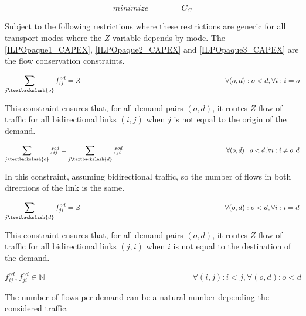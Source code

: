 \begin{equation}
minimize \qquad \qquad C_C
\label{ILPOpaque_CAPEX}
\end{equation}

\vspace{11pt}
Subject to the following restrictions where these restrictions are generic for all transport modes where the $Z$ variable depends by mode. The \ref{ILPOpaque1_CAPEX}, \ref{ILPOpaque2_CAPEX} and \ref{ILPOpaque3_CAPEX} are the flow conservation constraints.

\begin{equation}
\sum_{j\textbackslash \{o\}} f_{ij}^{od} = Z  \qquad \qquad \qquad \qquad \qquad \qquad \qquad \qquad \qquad \qquad
\forall(o,d) : o < d, \forall i: i = o
\label{ILPOpaque1_CAPEX}
\end{equation}

This constraint ensures that, for all demand pairs $(o,d)$, it routes $Z$ flow of traffic for all bidirectional links $(i,j)$ when $j$ is not equal to the origin of the demand.

\begin{equation}
\sum_{j\textbackslash \{o\}} f_{ij}^{od} = \sum_{j\textbackslash \{d\}} f_{ji}^{od}   \qquad \qquad \qquad \qquad \qquad \qquad \qquad \qquad
\forall(o,d) : o < d, \forall i: i \neq o,d
\label{ILPOpaque2_CAPEX}
\end{equation}

In this constraint, assuming bidirectional traffic, so the number of flows in both directions of the link is the same.

\begin{equation}
\sum_{j\textbackslash \{d\}} f_{ji}^{od} = Z  \qquad \qquad \qquad \qquad \qquad \qquad \qquad \qquad \qquad \qquad
\forall(o,d) : o < d, \forall i: i = d
\label{ILPOpaque3_CAPEX}
\end{equation}

This constraint ensures that, for all demand pairs $(o,d)$, it routes $Z$ flow of traffic for all bidirectional links $(j,i)$ when $i$ is not equal to the destination of the demand.

\begin{equation}
f_{ij}^{od} , f_{ji}^{od} \in \mathbb{N}   \qquad \qquad \qquad \qquad \qquad \qquad \qquad \qquad \qquad
\forall(i,j) : i < j, \forall(o,d) : o < d
\label{ILPOpaque6_CAPEX}
\end{equation}

The number of flows per demand can be a natural number depending the considered traffic.\\

